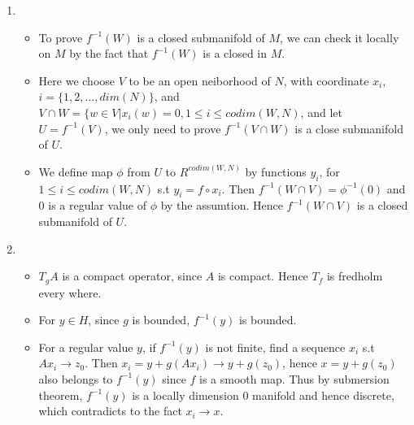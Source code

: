 \documentclass{article}
\begin{document}
\begin{enumerate}
\item
  \begin{itemize}
  \item To prove $f^{-1}(W)$ is a closed submanifold of $M$, we can check it locally on $M$ by the fact that  $f^{-1}(W)$ is a closed in $M$.
  \item Here we choose $V$ to be an open neiborhood of $N$, with coordinate $x_i$, $i=\{1,2, \ldots ,dim(N)\}$, and $V \cap W=\{ w\in V|x_i(w)=0,1 \leq i \leq codim(W,N)$, and let $U=f^{-1}(V)$, we only need to prove $f^{-1}(V\cap W)$ is a close submanifold of $U$.
  \item We define map $\phi$ from $U$ to $R^{codim(W,N)}$ by functions $y_i$, for $1\leq i\leq codim(W,N)$ s.t $y_i=f\circ x_i$. Then $f^{-1}(W\cap V)=\phi^{-1}(0)$ and 0 is a regular value of $\phi$ by the assumtion. Hence $f^{-1}(W\cap V)$ is a closed submanifold of $U$.
  \end{itemize}
\item
  \begin{itemize}
  \item $T_gA$ is a compact operator, since $A$ is compact. Hence $T_f$ is fredholm every where.
  \item For $y \in H$, since $g$ is bounded, $f^{-1}(y)$ is bounded.
  \item For a regular value $y$, if $f^{-1}(y)$ is not finite, find a sequence $x_i$ s.t $Ax_i \to z_0$. Then $x_i=y+g(Ax_i) \to y+g(z_0)$, hence $x=y+g(z_0)$ also belongs to $f^{-1}(y)$ since $f$ is a smooth map. Thus by submersion theorem, $f^{-1}(y)$ is a locally dimension 0 manifold and hence discrete, which contradicts to the fact $x_i \to x$.   
  \end{itemize}

\end{enumerate}
\end{document}
